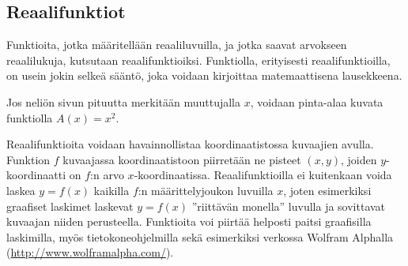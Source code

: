 \subsection*{Reaalifunktiot}

Funktioita, jotka määritellään reaaliluvuilla, ja jotka saavat arvokseen reaalilukuja, kutsutaan reaalifunktioiksi.
Funktiolla, erityisesti reaalifunktioilla, on usein jokin selkeä sääntö, joka voidaan kirjoittaa matemaattisena lausekkeena.

\begin{esimerkki}
	Jos neliön sivun pituutta merkitään muuttujalla $x$, voidaan pinta-alaa kuvata funktiolla $A(x) = x^2$.
\end{esimerkki} 

Reaalifunktioita voidaan havainnollistaa koordinaatistossa kuvaajien avulla.
Funktion $f$ kuvaajassa koordinaatistoon piirretään ne pisteet $(x, y)$, joiden $y$-koordinaatti on $f$:n arvo $x$-koordinaatissa.
Reaalifunktioilla ei kuitenkaan voida laskea $y = f(x)$ kaikilla $f$:n määrittelyjoukon luvuilla $x$, joten esimerkiksi graafiset laskimet
laskevat $y = f(x)$ ''riittävän monella'' luvulla ja sovittavat kuvaajan niiden perusteella.
Funktioita voi piirtää helposti paitsi graafisilla laskimilla, myös tietokoneohjelmilla sekä esimerkiksi verkossa
Wolfram Alphalla (\url{http://www.wolframalpha.com/}).

\def\vcent#1{\mathsurround0pt$\vcenter{\hbox{#1}}$}


